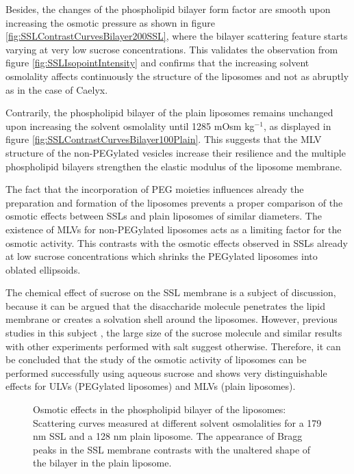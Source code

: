 Besides, the changes of the phospholipid bilayer form factor are smooth upon increasing the osmotic pressure as shown in figure \ref{fig:SSLContrastCurvesBilayer200SSL}, where the bilayer scattering feature starts varying at very low sucrose concentrations. This validates the observation from figure \ref{fig:SSLIsopointIntensity} and confirms that the increasing solvent osmolality affects continuously the structure of the liposomes and not as abruptly as in the case of Caelyx.

Contrarily, the phospholipid bilayer of the plain liposomes remains unchanged upon increasing the solvent osmolality until 1285 mOsm kg$^{-1}$, as displayed in figure \ref{fig:SSLContrastCurvesBilayer100Plain}. This suggests that the MLV structure of the non-PEGylated vesicles increase their resilience and the multiple phospholipid bilayers strengthen the elastic modulus of the liposome membrane.

The fact that the incorporation of PEG moieties influences already the preparation and formation of the liposomes prevents a proper comparison of the osmotic effects between SSLs and plain liposomes of similar diameters. The existence of MLVs for non-PEGylated liposomes acts as a limiting factor for the osmotic activity. This contrasts with the osmotic effects observed in SSLs already at low sucrose concentrations which shrinks the PEGylated liposomes into oblated ellipsoids. 

The chemical effect of sucrose on the SSL membrane is a subject of discussion, because it can be argued that the disaccharide molecule penetrates the lipid membrane or creates a solvation shell around the liposomes. However, previous studies in this subject \citep{ kiselev_sucrose_2001-2, kiselev_sucrose_2001,kiselev_does_2003}, the large size of the sucrose molecule and similar results with other experiments performed with salt \citep{varga_osmotic_2014} suggest otherwise. Therefore, it can be concluded that the study of the osmotic activity of liposomes can be performed successfully using aqueous sucrose and shows very distinguishable effects for ULVs (PEGylated liposomes) and MLVs (plain liposomes).

\begin{figure}
	\centering
		\subfloat[PEG 179 nm]{\resizebox{0.5\linewidth}{!}{\figfont{10pt}}\label{fig:SSLContrastCurvesBilayer200SSL}}
		\subfloat[Plain 128 nm]{\resizebox{0.5\linewidth}{!}{\figfont{10pt}}\label{fig:SSLContrastCurvesBilayer100Plain}}
		\caption[Osmotic effects in the phospholipid bilayer of the liposomes.]{Osmotic effects in the phospholipid bilayer of the liposomes: Scattering curves measured at different solvent osmolalities for a 179 nm SSL and a 128 nm plain liposome. The appearance of Bragg peaks in the SSL membrane contrasts with the unaltered shape of the bilayer in the plain liposome.}
\end{figure}

